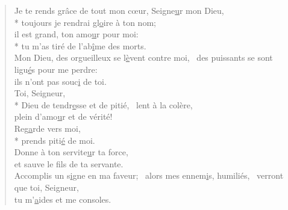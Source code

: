 \begin{verse}
Je te rends grâce de tout mon cœur, Seigne\underline{u}r mon Dieu, \\*
toujours je rendrai gl\underline{o}ire à ton nom; \\
il est grand, ton amo\underline{u}r pour moi: \\*
tu m’as tiré de l’ab\underline{î}me des morts. \\

Mon Dieu, des orgueilleux se l\underline{è}vent contre moi,~\psalmdagger
des puissants se sont ligu\underline{é}s pour me perdre: \\
ils n’ont pas souc\underline{i} de toi. \\

Toi, Seigneur, \\*
Dieu de tendr\underline{e}sse et de pitié,~\psalmstar
lent à la colère, \\
plein d’amo\underline{u}r et de vérité! \\

Reg\underline{a}rde vers moi, \\*
prends piti\underline{é} de moi. \\
Donne à ton servite\underline{u}r ta force, \\
et sauve le f\underline{i}ls de ta servante. \\

Accomplis un s\underline{i}gne en ma faveur;~\psalmdagger
alors mes ennem\underline{i}s, humiliés,~\psalmstar
verront que toi, Seigneur, \\
tu m’\underline{a}ides et me consoles. \\
\end{verse}

